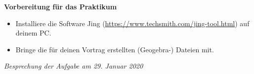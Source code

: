 \documentclass[a4paper,11pt]{scrreprt} %
\theoremstyle{definition} %
\begin{document}

\textbf{Vorbereitung für das Praktikum}
\begin{itemize}
    \item Installiere die Software Jing (\url{https://www.techsmith.com/jing-tool.html}) auf deinem PC.
    \item Bringe die für deinen Vortrag erstellten (Geogebra-) Dateien mit.\\
\end{itemize}




\vspace*{\fill} %

\begin{flushright}
\textit{Besprechung der Aufgabe am 29. Januar 2020}
\end{flushright}
\end{document}

